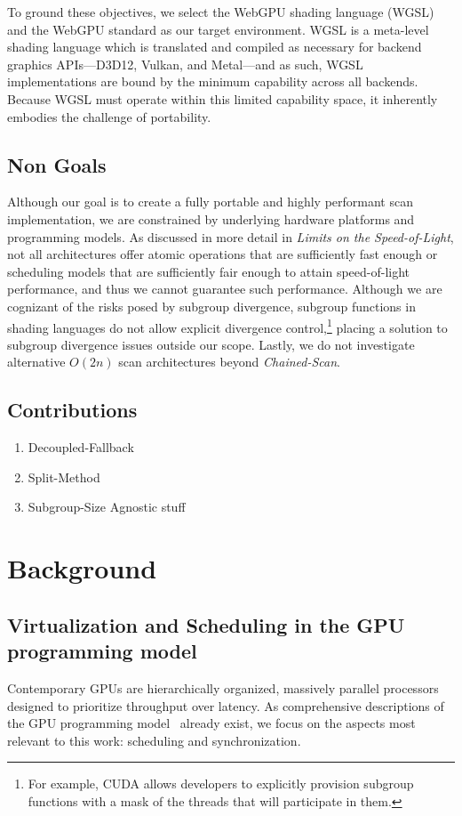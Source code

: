 \documentclass[sigconf]{acmart}
\begin{document}
\noindent
To ground these objectives, we select the WebGPU shading language (WGSL) and the WebGPU standard as our target environment. WGSL is a meta-level shading language which is translated and compiled as necessary for backend graphics APIs---D3D12, Vulkan, and Metal---and as such, WGSL implementations are bound by the minimum capability across all backends. Because WGSL must operate within this limited capability space, it inherently embodies the challenge of portability.

\subsection{Non Goals}
Although our goal is to create a fully portable and highly performant scan implementation, we are constrained by underlying hardware platforms and programming models. As discussed in more detail in \emph{Limits on the Speed-of-Light}, not all architectures offer atomic operations that are sufficiently fast enough or scheduling models that are sufficiently fair enough to attain speed-of-light performance, and thus we cannot guarantee such performance. Although we are cognizant of the risks posed by subgroup divergence, subgroup functions in shading languages do not allow explicit divergence control,\footnote{For example, CUDA allows developers to explicitly provision subgroup functions with a mask of the threads that will participate in them.} placing a solution to subgroup divergence issues outside our scope. Lastly, we do not investigate alternative $O(2n)$ scan architectures beyond \emph{Chained-Scan}.

\subsection{Contributions}
\begin{enumerate}
  \item Decoupled-Fallback
  \item Split-Method
  \item Subgroup-Size Agnostic stuff
\end{enumerate}

\section{Background}
\subsection{Virtualization and Scheduling in the GPU programming model}
Contemporary GPUs are hierarchically organized, massively parallel processors designed to prioritize throughput over latency. As comprehensive descriptions of the GPU programming model~\cite{10.1145/1365490.1365500} already exist, we focus on the aspects most relevant to this work: scheduling and synchronization.
\end{document}
